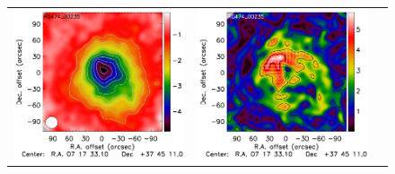 \documentclass[twocolumn,traditabstract]{aa}
\begin{document}
\begin{figure}[h]
{\begin{tabular}{lll}
\includegraphics[trim=0cm 0.7cm 0cm 0cm, clip=true, scale=1]{Figure/Map_RG474_00235_Ymap_zobs0p4_processed.pdf} & 
\includegraphics[trim=2.3cm 0.7cm 0cm 0cm, clip=true, scale=1]{Figure/Grad_RG474_00235_Ymap_zobs0p4_processed_15_15_45.pdf} & 

\end{tabular}}
\end{figure}
\end{document}
